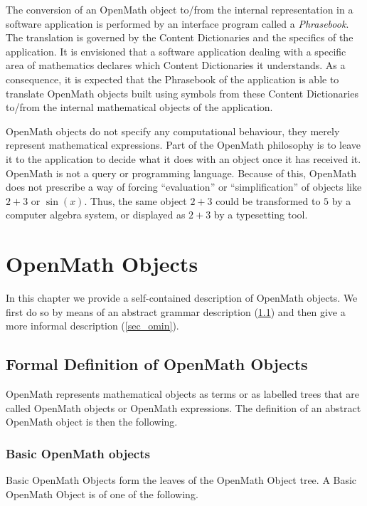 \documentclass{report}
\def\textquote#1{``#1''}
\def\OM{OpenMath\xspace}
\begin{document}
The conversion of an \OM object to/from the internal representation in a software
application is performed by an interface program called a \emph{Phrasebook}. The
translation is governed by the Content Dictionaries and the specifics of the
application. It is envisioned that a software application dealing with a specific area of
mathematics declares which Content Dictionaries it understands. As a consequence, it is
expected that the Phrasebook of the application is able to translate \OM objects built
using symbols from these Content Dictionaries to/from the internal mathematical objects of
the application.

\OM objects do not specify any computational behaviour, they merely represent mathematical
expressions.  Part of the \OM philosophy is to leave it to the application to decide what
it does with an object once it has received it.  \OM is not a query or programming
language. Because of this, \OM does not prescribe a way of forcing \textquote{evaluation}
or \textquote{simplification} of objects like $2+3$ or $\sin(x)$. Thus, the same object
$2+3$ could be transformed to $5$ by a computer algebra system, or displayed as $2+3$ by a
typesetting tool.

\chapter{\OM Objects}\label{cha_obj}

In this chapter we provide a self-contained description of \OM objects. We first do so by
means of an abstract grammar description (\ref{sec_omabs}) and then give a more informal
description (\ref{sec_omin}).

\section{Formal Definition of \OM Objects}\label{sec_omabs}


\OM represents mathematical objects as terms or as labelled
trees that are called \OM objects or \OM expressions. The definition
of an abstract \OM object is then the following.



\subsection{Basic \OM objects}\label{sec_basic} 

Basic \OM Objects form the leaves of the \OM Object tree.  A Basic \OM Object is of one of
the following.
 
\end{document}

